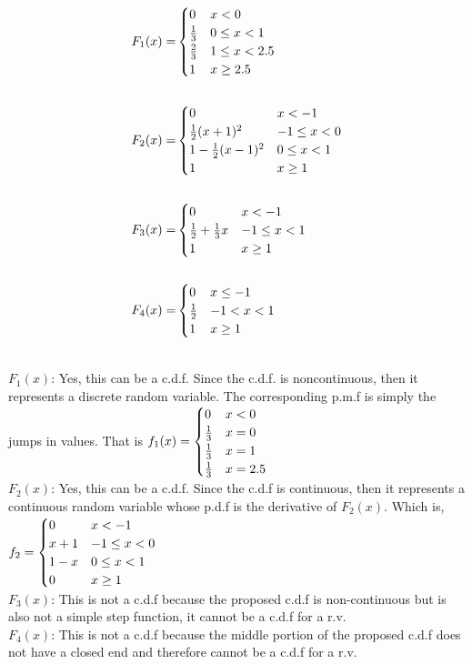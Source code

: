 \documentclass[letterpaper,12pt,addpoints]{exam}
\begin{document}
\begin{questions}
\begin{fleqn}[\parindent]
\begin{align*}
 F_1(x)=&\begin{cases}
           0 & x<0\crcr
          \frac13 & 0 \leq x < 1\crcr
          \frac23 & 1 \leq x < 2.5\crcr
          1 & x  \geq 2.5\crcr
        \end{cases}\\ \\
 F_2(x)=&\begin{cases}
           0 & x<-1\crcr
          \frac12(x+1)^2 & -1 \leq x < 0\crcr
          1-\frac12(x-1)^2 & 0 \leq x < 1\crcr
          1 & x  \geq 1\crcr
        \end{cases}\\ \\
 F_3(x)=&\begin{cases}
           0 & x<-1\crcr
           \frac12+\frac13x  & -1 \leq x < 1\crcr
           1 & x  \geq 1\crcr
        \end{cases}\\  \\
 F_4(x)=&\begin{cases}
           0 & x\leq-1\crcr
           \frac12  & -1 < x < 1\crcr
           1 & x  \geq 1\crcr
        \end{cases}      
\end{align*}
\end{fleqn}

\begin{solution}\\
$F_1(x)$: Yes, this can be a c.d.f. Since the c.d.f. is noncontinuous, then it represents a discrete random variable. The corresponding p.m.f is simply the jumps in values. That is $f_1(x)=
\begin{cases}
0 & x<0 \crcr
\frac{1}{3} & x=0\crcr
\frac{1}{3} & x=1 \crcr
\frac{1}{3} & x=2.5
\end{cases}$\\
$F_2(x)$: Yes, this can be a c.d.f. Since the c.d.f is continuous, then it represents a continuous random variable whose p.d.f is the derivative of $F_2(x)$. Which is, $f_2 = 
\begin{cases}
0 & x < -1\crcr
x+1 & -1\leq x < 0\crcr
1-x & 0\leq x < 1\crcr
0 & x\geq 1
\end{cases}$
\\
$F_3(x)$: This is not a c.d.f because the proposed c.d.f is non-continuous but is also not a simple step function, it cannot be a c.d.f for a r.v.\\
$F_4(x)$: This is not a c.d.f because the middle portion of the proposed c.d.f does not have a closed end and therefore cannot be a c.d.f for a r.v.
\end{solution}


\end{questions}
\vspace*{\fill}
\eject
\end{document}
